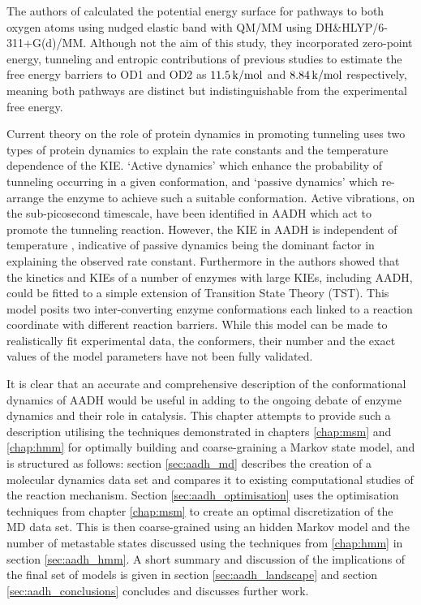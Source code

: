 The authors of \cite{ranaghanInitioQMMM2017} calculated the potential energy surface for pathways to both oxygen atoms using nudged elastic band with QM/MM using DH\&HLYP/6-311+G(d)/MM. Although not the aim of this study, they incorporated zero-point energy, tunneling and entropic contributions of previous studies \cite{masgrauAtomicDescriptionEnzyme2006}\cite{masgrauTunnelingClassicalPaths2007} to estimate the free energy barriers to OD1 and OD2 as $\SI{11.5}{\kilo\cal\per\mol}$ and $\SI{8.84}{\kilo\cal\per\mol}$ respectively, meaning both pathways are distinct but indistinguishable from the experimental free energy.  

Current theory on the role of protein dynamics in promoting tunneling  \cite{kuznetsovProtonHydrogenAtom1999a}\cite{masgrau2004hydrogen} uses two types of protein dynamics to explain the rate constants and the temperature dependence of the KIE. `Active dynamics' which enhance the probability of tunneling occurring in a given conformation, and `passive dynamics' which re-arrange the enzyme to achieve such a suitable conformation. Active vibrations, on the sub-picosecond timescale,  have been identified in AADH \cite{johannissenEnzymeAromaticAmine2008}\cite{johannissenProtonTunnelingAromatic2007} which act to promote the tunneling reaction.  However, the KIE in AADH is independent of temperature \cite{masgrauAtomicDescriptionEnzyme2006}, indicative of passive dynamics being the dominant factor in explaining the observed rate constant. Furthermore in  \cite{glowackiProteinDynamicsEnzyme2012a}\cite{glowackiTakingOckhamRazor2012b} the authors showed that the kinetics and KIEs of a number of enzymes with large KIEs, including AADH, could be fitted to a simple extension of Transition State Theory (TST). This model posits two inter-converting enzyme conformations each linked to a reaction coordinate with different reaction barriers. While this model can be made to  realistically fit experimental data, the conformers, their number and the exact values of the model parameters have not been fully validated. 

It is clear that an accurate and comprehensive description of the conformational dynamics of AADH would be useful in adding to the ongoing debate of enzyme dynamics and their role in catalysis. This chapter attempts to provide such a description utilising the techniques demonstrated in chapters \ref{chap:msm} and \ref{chap:hmm} for optimally building and coarse-graining a Markov state model, and is structured as follows: section \ref{sec:aadh_md} describes the creation of a molecular dynamics data set and compares it to existing computational studies of the reaction mechanism. Section \ref{sec:aadh_optimisation} uses the optimisation techniques from chapter \ref{chap:msm} to create an optimal discretization of the MD data set. This is then coarse-grained using an hidden Markov model and the number of metastable states discussed using the techniques from \ref{chap:hmm} in section \ref{sec:aadh_hmm}. A short summary and discussion of the implications of the final set of models is given in section \ref{sec:aadh_landscape} and section \ref{sec:aadh_conclusions} concludes and discusses further work. 

